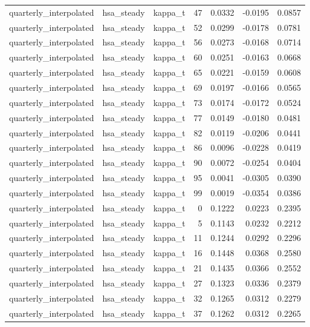 \begin{tabular}{lllrrrr}
quarterly\_interpolated & hsa\_steady & kappa\_t & 47 & 0.0332 & -0.0195 & 0.0857 \\
quarterly\_interpolated & hsa\_steady & kappa\_t & 52 & 0.0299 & -0.0178 & 0.0781 \\
quarterly\_interpolated & hsa\_steady & kappa\_t & 56 & 0.0273 & -0.0168 & 0.0714 \\
quarterly\_interpolated & hsa\_steady & kappa\_t & 60 & 0.0251 & -0.0163 & 0.0668 \\
quarterly\_interpolated & hsa\_steady & kappa\_t & 65 & 0.0221 & -0.0159 & 0.0608 \\
quarterly\_interpolated & hsa\_steady & kappa\_t & 69 & 0.0197 & -0.0166 & 0.0565 \\
quarterly\_interpolated & hsa\_steady & kappa\_t & 73 & 0.0174 & -0.0172 & 0.0524 \\
quarterly\_interpolated & hsa\_steady & kappa\_t & 77 & 0.0149 & -0.0180 & 0.0481 \\
quarterly\_interpolated & hsa\_steady & kappa\_t & 82 & 0.0119 & -0.0206 & 0.0441 \\
quarterly\_interpolated & hsa\_steady & kappa\_t & 86 & 0.0096 & -0.0228 & 0.0419 \\
quarterly\_interpolated & hsa\_steady & kappa\_t & 90 & 0.0072 & -0.0254 & 0.0404 \\
quarterly\_interpolated & hsa\_steady & kappa\_t & 95 & 0.0041 & -0.0305 & 0.0390 \\
quarterly\_interpolated & hsa\_steady & kappa\_t & 99 & 0.0019 & -0.0354 & 0.0386 \\
quarterly\_interpolated & hsa\_steady & kappa\_t & 0 & 0.1222 & 0.0223 & 0.2395 \\
quarterly\_interpolated & hsa\_steady & kappa\_t & 5 & 0.1143 & 0.0232 & 0.2212 \\
quarterly\_interpolated & hsa\_steady & kappa\_t & 11 & 0.1244 & 0.0292 & 0.2296 \\
quarterly\_interpolated & hsa\_steady & kappa\_t & 16 & 0.1448 & 0.0368 & 0.2580 \\
quarterly\_interpolated & hsa\_steady & kappa\_t & 21 & 0.1435 & 0.0366 & 0.2552 \\
quarterly\_interpolated & hsa\_steady & kappa\_t & 27 & 0.1323 & 0.0336 & 0.2379 \\
quarterly\_interpolated & hsa\_steady & kappa\_t & 32 & 0.1265 & 0.0312 & 0.2279 \\
quarterly\_interpolated & hsa\_steady & kappa\_t & 37 & 0.1262 & 0.0312 & 0.2265 \\

\end{tabular}
